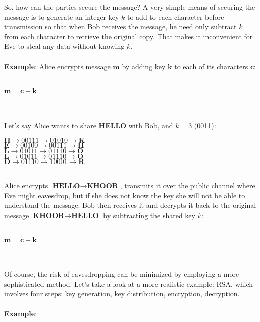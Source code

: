 So, how can the parties secure the message?
A very simple means of securing the message is to generate an integer key $k$ to add to each character before transmission so that
when Bob receives the message, he need only subtract $k$ from each character to retrieve the original copy. 
That makes it inconvenient for Eve to steal any data without knowing $k$.\\~\\
\textbf{\underline{Example}}:
Alice encrypts message $\textbf{m}$ by adding key $\textbf{k}$ to each of its characters $\textbf{c}$:\\~\\
\centerline{$\textbf{m} = \textbf{c} + \textbf{k}$}\\~\\
Let's say Alice wants to share \textbf{HELLO} with Bob, and $k = 3$ (0011):
\\
\begin{center}
$\textbf{H} \rightarrow 00111 \rightarrow 01010 \rightarrow \textbf{K}$ \\
$\textbf{E} \rightarrow 00100 \rightarrow 00111 \rightarrow \textbf{H}$ \\
$\textbf{L} \rightarrow 01011 \rightarrow 01110 \rightarrow \textbf{O}$ \\
$\textbf{L} \rightarrow 01011 \rightarrow 01110 \rightarrow \textbf{O}$ \\
$\textbf{O} \rightarrow 01110 \rightarrow 10001 \rightarrow \textbf{R}$ \\
\end{center}
~\\
Alice encrypts $\textbf{HELLO} \rightarrow \textbf{KHOOR}$, transmits it over the public channel where Eve might eavesdrop,
but if she does not know the key she will not be able to understand the message. Bob then receives it and decrypts it back 
to the original message $\textbf{KHOOR} \rightarrow \textbf{HELLO}$ by subtracting the shared key $k$:\\~\\
\centerline{$\textbf{m} = \textbf{c} - \textbf{k}$}\\~\\
Of course, the risk of eavesdropping can be minimized by employing a more sophisticated method.
Let's take a look at a more realistic example: RSA, 
which involves four steps: key generation, key distribution, encryption, decryption.\\\\
\textbf{\underline{Example}}:\\
